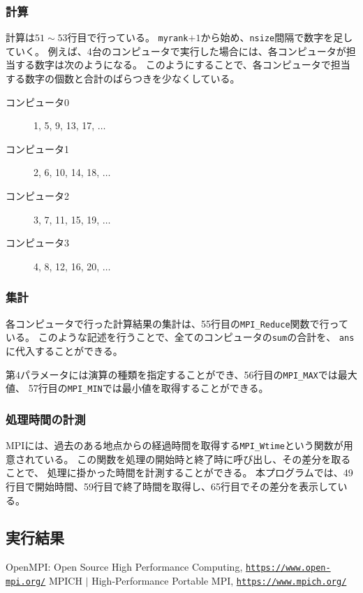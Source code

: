\documentclass[a4j,titlepage]{jsarticle}
\begin{document}
\subsubsection{計算}
計算は$51 \sim 53$行目で行っている。
\texttt{myrank}$+1$から始め、\texttt{nsize}間隔で数字を足していく。
例えば、4台のコンピュータで実行した場合には、各コンピュータが担当する数字は次のようになる。
このようにすることで、各コンピュータで担当する数字の個数と合計のばらつきを少なくしている。

\begin{description}
  \item[コンピュータ0] 1, 5, 9,  13, 17, $\dots$
  \item[コンピュータ1] 2, 6, 10, 14, 18, $\dots$
  \item[コンピュータ2] 3, 7, 11, 15, 19, $\dots$
  \item[コンピュータ3] 4, 8, 12, 16, 20, $\dots$
\end{description}

\subsubsection{集計}
各コンピュータで行った計算結果の集計は、55行目の\texttt{MPI\_Reduce}関数で行っている。
このような記述を行うことで、全てのコンピュータの\texttt{sum}の合計を、
\texttt{ans}に代入することができる。

第4パラメータには演算の種類を指定することができ、56行目の\texttt{MPI\_MAX}では最大値、
57行目の\texttt{MPI\_MIN}では最小値を取得することができる。

\subsubsection{処理時間の計測}
MPIには、過去のある地点からの経過時間を取得する\texttt{MPI\_Wtime}という関数が用意されている。
この関数を処理の開始時と終了時に呼び出し、その差分を取ることで、
処理に掛かった時間を計測することができる。
本プログラムでは、49行目で開始時間、59行目で終了時間を取得し、65行目でその差分を表示している。

\subsection{実行結果}


\begin{thebibliography}{9}
   OpenMPI: Open Source High Performance Computing, \texttt{\url{https://www.open-mpi.org/}}
   MPICH $|$ High-Performance Portable MPI, \texttt{\url{https://www.mpich.org/}}
\end{thebibliography}
\end{document}
